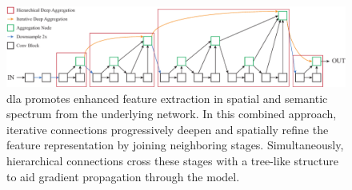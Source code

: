 \begin{figure}[t]
    \centerline{\includegraphics[width=0.9\linewidth]{figures/theoretical_foundations/dla_ida_hda_combination.pdf}}
    \caption[Combination of \gls{dla} approaches]{\Gls{dla} promotes enhanced feature extraction in spatial and semantic spectrum from the underlying network. In this combined approach, iterative connections progressively deepen and spatially refine the feature representation by joining neighboring stages. Simultaneously, hierarchical connections cross these stages with a tree-like structure to aid gradient propagation through the model. }
    \label{fig:DLACombination}
\end{figure}
